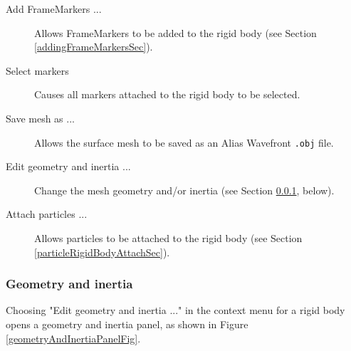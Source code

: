 \documentclass{article}
\begin{document}
\begin{description}

\item[Add FrameMarkers ...]\mbox{}

Allows FrameMarkers to be added to the rigid body (see Section \ref{addingFrameMarkersSec}).

\item[Select markers]\mbox{}

Causes all markers attached to the rigid body to be selected.

\item[Save mesh as ...]\mbox{}

Allows the surface mesh to be saved as an Alias Wavefront {\tt .obj} file.

\item[Edit geometry and inertia ...]\mbox{}

Change the mesh geometry and/or inertia (see Section \ref{geometryAndInertiaSec}, below).

\item[Attach particles ...]\mbox{}

Allows particles to be attached to the rigid body 
(see Section \ref{particleRigidBodyAttachSec}).

\end{description}

\subsubsection{Geometry and inertia}
\label{geometryAndInertiaSec}

Choosing {\sf "Edit geometry and inertia ..."} in the context menu for
a rigid body opens a geometry and inertia panel, as shown in
Figure \ref{geometryAndInertiaPanelFig}.
\end{document}
